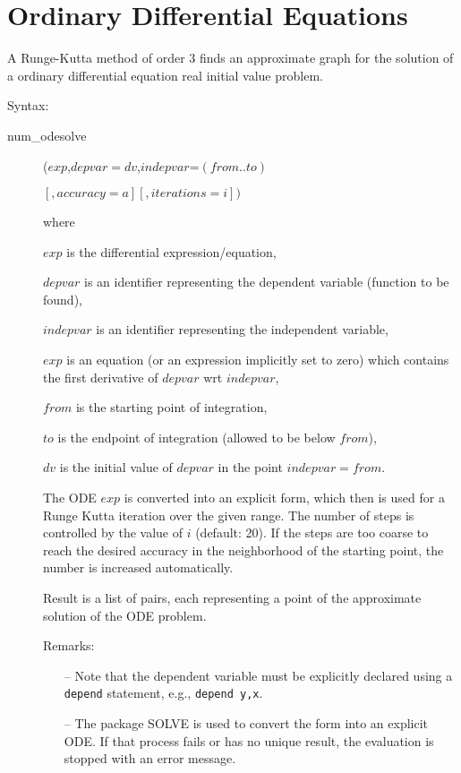 \section{Ordinary Differential Equations}
\hypertarget{operator:NUM_ODESOLVE}{}

A Runge-Kutta method of order 3 finds an approximate graph for
the solution of a ordinary differential equation
real initial value problem.

Syntax:
\begin{description}
\item[num\_odesolve]($exp$,$depvar=dv$,$indepvar$=$(from .. to)$

$                   [,accuracy=a][,iterations=i]) $

where

$exp$ is the differential expression/equation,

$depvar$ is an identifier representing the dependent variable
(function to be found),

$indepvar$ is an identifier representing the independent variable,

$exp$ is an equation (or an expression implicitly set to zero) which
contains the first derivative of $depvar$ wrt $indepvar$,

$from$ is the starting point of integration,

$to$ is the endpoint of integration (allowed to be below $from$),

$dv$ is the initial value of $depvar$ in the point $indepvar=from$.

The ODE $exp$ is converted into an explicit form, which then is
used for a Runge Kutta iteration over the given range. The
number of steps is controlled by the value of $i$
(default: 20).
If the steps are too coarse to reach the desired
accuracy in the neighborhood of the starting point, the number is
increased automatically.

Result is a list of pairs, each representing a point of the
approximate solution of the ODE problem.

Remarks:
\begin{enumerate}

  \item[--]
Note that the dependent variable must be explicitly declared
using a \texttt{depend} statement, e.g., \texttt{depend y,x}.
\item[--] The \REDUCE{} package \textsc{SOLVE} is used to convert the form into
an explicit ODE. If that process fails or has no unique result,
the evaluation is stopped with an error message.

\end{enumerate}

\end{description}

